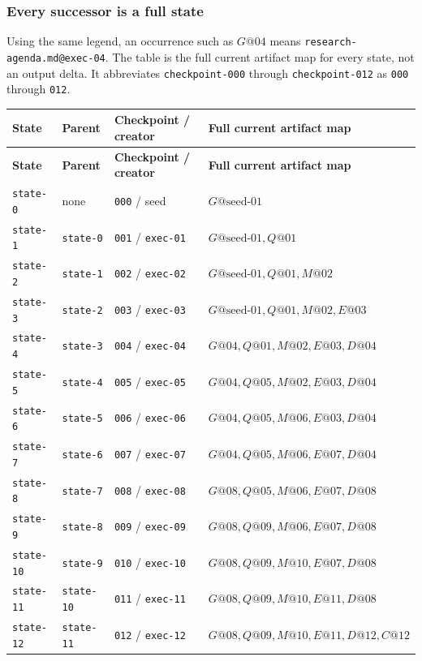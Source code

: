 \documentclass[11pt]{article}
\begin{document}
\subsubsection{Every successor is a full state}

Using the same legend, an occurrence such as \(G@04\) means
\texttt{research-agenda.md@exec-04}. The table is the full current artifact map
for every state, not an output delta. It abbreviates
\texttt{checkpoint-000} through \texttt{checkpoint-012} as
\texttt{000} through \texttt{012}.

{\scriptsize
\begin{longtable}{@{}L{0.62in}L{0.76in}L{0.90in}L{3.65in}@{}}
\toprule
\textbf{State} & \textbf{Parent} & \textbf{Checkpoint / creator} & \textbf{Full current artifact map} \\
\midrule
\endfirsthead
\toprule
\textbf{State} & \textbf{Parent} & \textbf{Checkpoint / creator} & \textbf{Full current artifact map} \\
\midrule
\endhead
\texttt{state-0} & none & \texttt{000} / seed & \(G@\mathrm{seed\mbox{-}01}\) \\
\texttt{state-1} & \texttt{state-0} & \texttt{001} / \texttt{exec-01} & \(G@\mathrm{seed\mbox{-}01}, Q@01\) \\
\texttt{state-2} & \texttt{state-1} & \texttt{002} / \texttt{exec-02} & \(G@\mathrm{seed\mbox{-}01}, Q@01, M@02\) \\
\texttt{state-3} & \texttt{state-2} & \texttt{003} / \texttt{exec-03} & \(G@\mathrm{seed\mbox{-}01}, Q@01, M@02, E@03\) \\
\texttt{state-4} & \texttt{state-3} & \texttt{004} / \texttt{exec-04} & \(G@04, Q@01, M@02, E@03, D@04\) \\
\texttt{state-5} & \texttt{state-4} & \texttt{005} / \texttt{exec-05} & \(G@04, Q@05, M@02, E@03, D@04\) \\
\texttt{state-6} & \texttt{state-5} & \texttt{006} / \texttt{exec-06} & \(G@04, Q@05, M@06, E@03, D@04\) \\
\texttt{state-7} & \texttt{state-6} & \texttt{007} / \texttt{exec-07} & \(G@04, Q@05, M@06, E@07, D@04\) \\
\texttt{state-8} & \texttt{state-7} & \texttt{008} / \texttt{exec-08} & \(G@08, Q@05, M@06, E@07, D@08\) \\
\texttt{state-9} & \texttt{state-8} & \texttt{009} / \texttt{exec-09} & \(G@08, Q@09, M@06, E@07, D@08\) \\
\texttt{state-10} & \texttt{state-9} & \texttt{010} / \texttt{exec-10} & \(G@08, Q@09, M@10, E@07, D@08\) \\
\texttt{state-11} & \texttt{state-10} & \texttt{011} / \texttt{exec-11} & \(G@08, Q@09, M@10, E@11, D@08\) \\
\texttt{state-12} & \texttt{state-11} & \texttt{012} / \texttt{exec-12} & \(G@08, Q@09, M@10, E@11, D@12, C@12\) \\
\bottomrule
\end{longtable}
}
\end{document}
